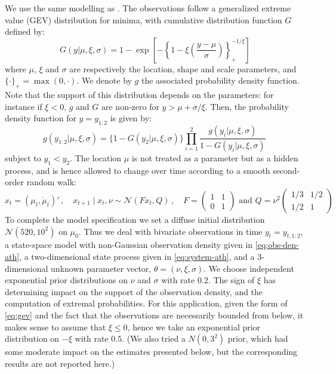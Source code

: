 \documentclass{statsoc}
\begin{document}
We use the same modelling as \citet{fearnhead2010smoothinglinear}. The 
observations follow a
generalized extreme value (GEV) distribution for minima, with cumulative
distribution function $G$ defined by:
\begin{equation}
  \label{eq:gev}
  G(y \vert \mu, \xi, \sigma) = 1 - \exp\left[-\left\{1 - \xi
\left(\frac{y - \mu}{\sigma}\right)\right\}_+^{-1/\xi}\right]
\end{equation}
where $\mu$, $\xi$ and $\sigma$ are respectively the location, shape and scale
parameters, and $\{\cdot\}_+ = \max(0, \cdot)$. We denote by $g$ the associated
probability density function. Note that the support of this distribution depends
on the parameters: for instance if $\xi < 0$, $g$ and $G$ are non-zero
 for $y > \mu + \sigma/\xi$. Then, the probability density function
 for $y=y_{1:2}$ is given by:
 \begin{equation}
   \label{eq:obs-den-ath}
   g(y_{1:2}\vert \mu, \xi, \sigma) = \{1 - G(y_2\vert\mu, \xi, \sigma)\}
\prod_{i=1}^2 \frac{g(y_{i}\vert \mu, \xi, \sigma)}{1 - G(y_{i}\vert \mu,
\xi, \sigma)}\,
 \end{equation}
subject to $y_1<y_2$. 
The location $\mu$ is not treated as a parameter but as a hidden process, and
is hence allowed to change over time according to a smooth second-order random
walk:
\begin{equation}
  \label{eq:system-ath}
  x_{t} = (\mu_{t},\dot{\mu}_{t})'\,,\quad x_{t+1} \mid x_t,\nu \sim 
\mathcal{N}\left(F x_{t}, Q \right)\,,\quad 
F = \begin{pmatrix}
  1 & 1  \\
  0 & 1 \end{pmatrix}
\text{ and }
Q = \nu^2 \begin{pmatrix}
  1/3 & 1/2  \\
  1/2 & 1 \end{pmatrix}
\end{equation}
To complete the model specification we set a diffuse initial distribution
$\mathcal{N}(520, 10^2)$
on $\mu_0$. Thus we deal with  bivariate observations in time
$y_t=y_{t,1:2}$, a state-space model with non-Gaussian
observation density given in \eqref{eq:obs-den-ath}, a two-dimensional
state process given in \eqref{eq:system-ath}, and a $3$-dimensional
unknown parameter vector, $\theta =
(\nu, \xi, \sigma)$. We choose independent exponential prior distributions on
 $\nu$ and $\sigma$ with rate
$0.2$. The sign of $\xi$ has determining impact on the support of the
observation density, and the computation of extremal probabilities. For this application, given the form of
\eqref{eq:gev} and the fact that the observations are necessarily bounded from below,  
it makes sense to assume that $\xi\leq 0$, hence we take an exponential prior
distribution on $-\xi$ with rate $0.5$. (We also tried a $N(0,3^2)$ prior, which had some
moderate impact on the estimates presented below, but the corresponding results 
are not reported here.) 
\end{document}
